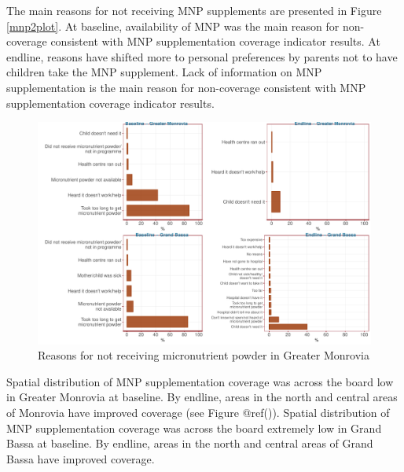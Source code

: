 \documentclass[12pt,a4paper]{article}
\begin{document}
The main reasons for not receiving MNP supplements are presented in Figure \ref{mnp2plot}. At baseline, availability of MNP was the main reason for non-coverage consistent with MNP supplementation coverage indicator results. At endline, reasons have shifted more to personal preferences by parents not to have children take the MNP supplement. Lack of information on MNP supplementation is the main reason for non-coverage consistent with MNP supplementation coverage indicator results.

\begin{figure}[H]

{\centering \includegraphics{liberiaCoverageFinalReport_files/figure-latex/mnp2plot-1} 

}

\caption{Reasons for not receiving micronutrient powder in Greater Monrovia}\label{fig:mnp2plot}
\end{figure}

Spatial distribution of MNP supplementation coverage was across the board low in Greater Monrovia at baseline. By endline, areas in the north and central areas of Monrovia have improved coverage (see Figure @ref(\citet{mnp1map})). Spatial distribution of MNP supplementation coverage was across the board extremely low in Grand Bassa at baseline. By endline, areas in the north and central areas of Grand Bassa have improved coverage.
\end{document}
